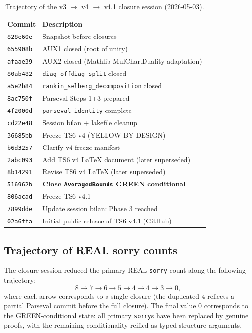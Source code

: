 \documentclass[11pt,a4paper]{article}
\theoremstyle{definition}
\begin{document}
\begin{table}[h]
\centering
\renewcommand{\arraystretch}{1.15}
\small
\begin{tabular}{@{}ll@{}}
\toprule
\textbf{Commit} & \textbf{Description} \\
\midrule
\verb|828e60e| & Snapshot before closures \\
\verb|655908b| & AUX1 closed (root of unity) \\
\verb|afaae39| & AUX2 closed (Mathlib MulChar.Duality adaptation) \\
\verb|80ab482| & \verb|diag_offdiag_split| closed \\
\verb|a5e2b84| & \verb|rankin_selberg_decomposition| closed \\
\verb|8ac750f| & Parseval Steps 1+3 prepared \\
\verb|4f2000d| & \verb|parseval_identity| complete \\
\verb|cd22e48| & Session bilan + lakefile cleanup \\
\verb|36685bb| & Freeze TS6 v4 (YELLOW BY-DESIGN) \\
\verb|b6d3257| & Clarify v4 freeze manifest \\
\verb|2abc093| & Add TS6 v4 LaTeX document (later superseded) \\
\verb|8b14291| & Revise TS6 v4 LaTeX (later superseded) \\
\verb|516962b| & \textbf{Close \texttt{AveragedBounds} GREEN-conditional} \\
\verb|806acad| & Freeze TS6 v4.1 \\
\verb|7899dde| & Update session bilan: Phase 3 reached \\
\verb|02a6ffa| & Initial public release of TS6 v4.1 (GitHub) \\
\bottomrule
\end{tabular}
\caption{Trajectory of the v3 $\to$ v4 $\to$ v4.1 closure session (2026-05-03).}\label{tab:git-trajectory}
\end{table}

\subsection{Trajectory of REAL sorry counts}

The closure session reduced the primary REAL \texttt{sorry} count along the following trajectory:
\[
  8 \to 7 \to 6 \to 5 \to 4 \to 4 \to 3 \to 0,
\]
where each arrow corresponds to a single closure (the duplicated 4 reflects a partial Parseval commit before the full closure). The final value 0 corresponds to the GREEN-conditional state: all primary \texttt{sorry}s have been replaced by genuine proofs, with the remaining conditionality reified as typed structure arguments.
\end{document}
